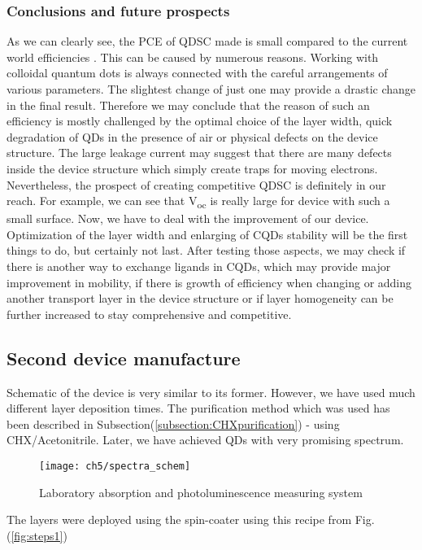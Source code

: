 \subsubsection{Conclusions and future prospects}

As we can clearly see, the PCE of QDSC made is small compared to the
current world efficiencies \cite{Kamat2018}. This can be caused by numerous reasons.
Working with colloidal quantum dots is always connected with the careful
arrangements of various parameters. The slightest change of just one may
provide a drastic change in the final result. Therefore we may conclude
that the reason of such an efficiency is mostly challenged by the
optimal choice of the layer width, quick degradation of QDs in the
presence of air or physical defects on the device structure. The large
leakage current may suggest that there are many defects inside the
device structure which simply create traps for moving electrons.
Nevertheless, the prospect of creating competitive QDSC is definitely in
our reach. For example, we can see that V\textsubscript{oc} is really
large for device with such a small surface. Now, we have to deal with
the improvement of our device. Optimization of the layer width and
enlarging of CQDs stability will be the first things to do, but
certainly not last. After testing those aspects, we may check if there
is another way to exchange ligands in CQDs, which may provide major
improvement in mobility, if there is growth of efficiency when changing
or adding another transport layer in the device structure or if layer
homogeneity can be further increased to stay comprehensive and
competitive.

\subsection{Second device manufacture}

Schematic of the device is very similar to its former. However, we have used much different layer deposition times. The purification method which was used has been described in Subsection(\ref{subsection:CHXpurification}) - using CHX/Acetonitrile. Later, we have achieved QDs with very promising spectrum.

\begin{figure}
\centering
\texttt{[image: ch5/spectra\_schem]}
\caption{Laboratory absorption and photoluminescence measuring system }
\end{figure}

The layers were deployed using the spin-coater using this recipe from Fig. (\ref{fig:steps1})

